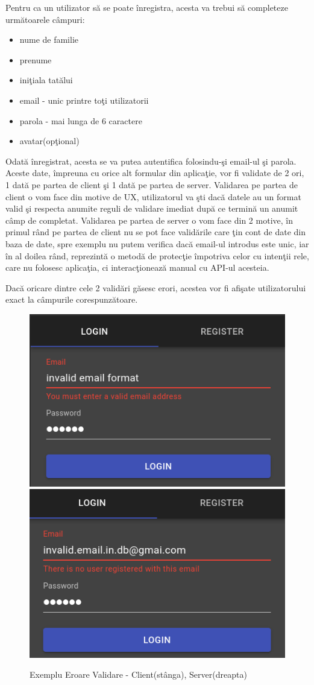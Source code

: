 \documentclass[12pt, a4paper, oneside, romanian]{teza-upb}
\begin{document}
Pentru ca un utilizator să se poate înregistra, acesta va trebui să completeze următoarele câmpuri:
\begin{itemize}
	\item nume de familie
	\item prenume
	\item iniţiala tatălui
	\item email - unic printre toţi utilizatorii
	\item parola - mai lunga de 6 caractere
	\item avatar(opţional)
\end{itemize}

Odată înregistrat, acesta se va putea autentifica folosindu-şi email-ul şi parola.\\

Aceste date, împreuna cu orice alt formular din aplicaţie, vor fi validate de 2 ori, 1 dată pe partea de client şi 1 dată pe partea de server. Validarea pe partea de client o vom face din motive de UX, utilizatorul va şti dacă datele au un format valid şi respecta anumite reguli de validare imediat după ce termină un anumit câmp de completat. Validarea pe partea de server o vom face din 2 motive, în primul rând pe partea de client nu se pot face validările care ţin cont de date din baza de date, spre exemplu nu putem verifica dacă email-ul introdus este unic, iar în al doilea rând, reprezintă o metodă de protecţie împotriva celor cu intenţii rele, care nu folosesc aplicaţia, ci interacţionează manual cu API-ul acesteia.\cite{formularbunepractici}

Dacă oricare dintre cele 2 validări găsesc erori, acestea vor fi afişate utilizatorului exact la câmpurile corespunzătoare.

\begin{figure}[H]
\centering
\includegraphics*[width=0.45\columnwidth]{exemplu-eroare-validare-frontend}
\includegraphics*[width=0.45\columnwidth]{exemplu-eroare-validare-backend}
\caption{Exemplu Eroare Validare - Client(stânga), Server(dreapta)}
\label{exemplu-eroare-validare}
\end{figure}
\end{document}

